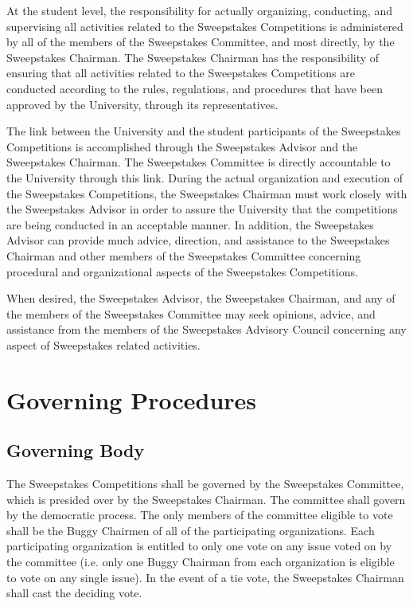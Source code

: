 	At the student level, the responsibility for actually organizing, conducting, and supervising all activities related to the Sweepstakes Competitions is administered by all of the members of the Sweepstakes Committee, and most directly, by the Sweepstakes Chairman. The Sweepstakes Chairman has the responsibility of ensuring that all activities related to the Sweepstakes Competitions are conducted according to the rules, regulations, and procedures that have been approved by the University, through its representatives.

	The link between the University and the student participants of the Sweepstakes Competitions is accomplished through the Sweepstakes Advisor and the Sweepstakes Chairman. The Sweepstakes Committee is directly accountable to the University through this link. During the actual organization and execution of the Sweepstakes Competitions, the Sweepstakes Chairman must work closely with the Sweepstakes Advisor in order to assure the University that the competitions are being conducted in an acceptable manner. In addition, the Sweepstakes Advisor can provide much advice, direction, and assistance to the Sweepstakes Chairman and other members of the Sweepstakes Committee concerning procedural and organizational aspects of the Sweepstakes Competitions.

	When desired, the Sweepstakes Advisor, the Sweepstakes Chairman, and any of the members of the Sweepstakes Committee may seek opinions, advice, and assistance from the members of the Sweepstakes Advisory Council concerning any aspect of Sweepstakes related activities.

\section{Governing Procedures}

\subsection{Governing Body}

	The Sweepstakes Competitions shall be governed by the Sweepstakes Committee, which is presided over by the Sweepstakes Chairman. The committee shall govern by the democratic process. The only members of the committee eligible to vote shall be the Buggy Chairmen of all of the participating organizations. Each participating organization is entitled to only one vote on any issue voted on by the committee (i.e. only one Buggy Chairman from each organization is eligible to vote on any single issue). In the event of a tie vote, the Sweepstakes Chairman shall cast the deciding vote.

